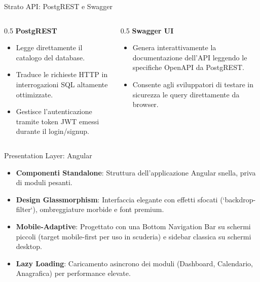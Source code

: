 \documentclass[aspectratio=169]{beamer}
\begin{document}
\begin{frame}{Strato API: PostgREST e Swagger}
    \begin{columns}
        \begin{column}{0.5\textwidth}
            \textbf{PostgREST}
            \begin{itemize}
                \item Legge direttamente il catalogo del database.
                \item Traduce le richieste HTTP in interrogazioni SQL altamente ottimizzate.
                \item Gestisce l'autenticazione tramite token JWT emessi durante il login/signup.
            \end{itemize}
        \end{column}
        \begin{column}{0.5\textwidth}
            \textbf{Swagger UI}
            \begin{itemize}
                \item Genera interattivamente la documentazione dell'API leggendo le specifiche OpenAPI da PostgREST.
                \item Consente agli sviluppatori di testare in sicurezza le query direttamente da browser.
            \end{itemize}
        \end{column}
    \end{columns}
\end{frame}

\begin{frame}{Presentation Layer: Angular}
    \begin{itemize}
        \item \textbf{Componenti Standalone}: Struttura dell'applicazione Angular snella, priva di moduli pesanti.
        \item \textbf{Design Glassmorphism}: Interfaccia elegante con effetti sfocati (`backdrop-filter`), ombreggiature morbide e font premium.
        \item \textbf{Mobile-Adaptive}: Progettato con una Bottom Navigation Bar su schermi piccoli (target mobile-first per uso in scuderia) e sidebar classica su schermi desktop.
        \item \textbf{Lazy Loading}: Caricamento asincrono dei moduli (Dashboard, Calendario, Anagrafica) per performance elevate.
    \end{itemize}
\end{frame}
\end{document}
